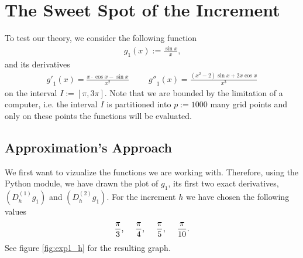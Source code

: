 \section{The Sweet Spot of the Increment}
To test our theory, we consider the following function
\begin{align*}
    g_1(x) := \frac{\sin{x}}{x} \text{,}
\end{align*}
and its derivatives
\begin{align*}
    {g'}_{1}(x) = \frac{x \cdot \cos{x} - \sin{x}}{x^2} \hspace{1cm} {g''}_{1}(x) = \frac{(x^2 - 2) \sin{x} + 2 x \cos{x}}{x^3} \text{}
\end{align*}
on the interval \(I := [\pi, 3\pi]\). Note that we are bounded by the limitation of a computer, i.e. the interval \(I\) is partitioned into \(p := 1000\) many grid points and only on these points the functions will be evaluated.


\subsection{Approximation's Approach} %

We first want to vizualize the functions we are working with. Therefore, using the Python module, we have drawn the plot of \(g_1\), its first two exact derivatives, \( (D^{(1)}_h g_1) \) and \( (D^{(2)}_h g_1 )\). For the increment \(h\) we have chosen the following values
\begin{align*}
    \frac{\pi}{3} \text{,} \hspace{0.5cm} \frac{\pi}{4} \text{,} \hspace{0.5cm} \frac{\pi}{5} \text{,} \hspace{0.5cm} \frac{\pi}{10} \text{.}
\end{align*}
See figure \ref{fig:exp1_h} for the resulting graph.

